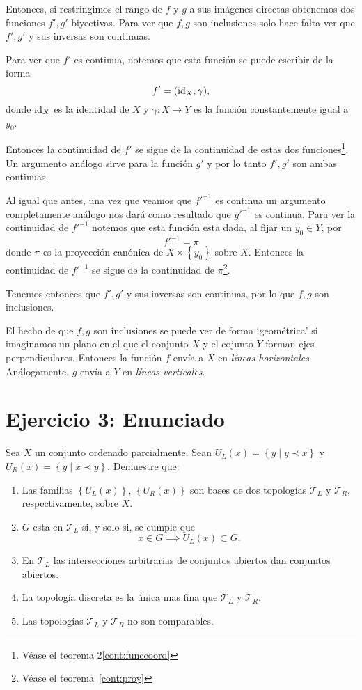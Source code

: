 \documentclass[fleqn,leqno,11pt,letterpaper,final]{article}
\begin{document}
Entonces, si restringimos el rango de $f$ y $g$ a sus
imágenes directas obtenemos dos funciones $f',g'$
biyectivas. Para ver que $f,g$ son inclusiones solo
hace falta ver que $f',g'$ y sus inversas son
continuas.

Para ver que $f'$ es continua, notemos que esta función
se puede escribir de la forma
\[
f'=(\operatorname{id}_X,\gamma),
\]
donde $\operatorname{id}_X$ es la identidad de $X$ y $\gamma:X\to Y$ 
es la función constantemente igual a $y_0$.

Entonces la continuidad de $f'$ se sigue de la
continuidad de estas dos funciones\footnote{Véase el teorema 2\ref{cont:funccoord}}. Un argumento
análogo sirve para la función $g'$ y por lo tanto
$f',g'$ son ambas continuas.

Al igual que antes, una vez que veamos que $f'^{-1}$ es
continua un argumento completamente análogo nos dará
como resultado que $g'^{-1}$ es continua. Para ver la
continuidad de $f'^{-1}$ notemos que esta función esta
dada, al fijar un $y_0\in Y$, por
\[
f'^{-1}=\pi	
\]
donde $\pi$ es la proyección canónica de $X\times\left\{ y_0 \right\}$
sobre $X$. Entonces la continuidad de $f'^{-1}$ se
sigue de la continuidad de $\pi$\footnote{Véase el teorema~\ref{cont:proy}}.

Tenemos entonces que $f',g'$ y sus inversas son
continuas, por lo que $f,g$ son inclusiones.

\begin{obs}
	El hecho de que $f,g$ son inclusiones se puede ver de forma `geométrica' si imaginamos un plano en el que el conjunto $X$ y el cojunto $Y$ forman ejes perpendiculares. Entonces la función $f$ envía a $X$ en \emph{líneas horizontales}. Análogamente, $g$ envía a $Y$ en \emph{líneas verticales}.
\end{obs}

\section{Ejercicio 3: Enunciado}
\hspace{-.6em}\footnotemark Sea $X$ un conjunto ordenado parcialmente. Sean $U_L(x)=\left\{ y\mid y\prec x \right\}$ y
$U_R(x)=\left\{ y\mid x\prec y \right\}$. Demuestre que:
\begin{enumerate}
	\item Las familias $\left\{ U_L(x) \right\}$, $\left\{ U_R(x) \right\}$ son bases de dos topologías
	$\mathcal{T}_L$ y $\mathcal{T}_R$, respectivamente, sobre $X$.
	\item $G$ esta en $\mathcal{T}_L$ si, y solo si, se cumple que 
	\[
	x\in G\implies U_L(x)\subset G.
	\]
	\item En $\mathcal{T}_L$ las intersecciones arbitrarias de conjuntos abiertos
	dan conjuntos abiertos.
	\item La topología discreta es la única mas fina que $\mathcal{T}_L$ y $\mathcal{T}_R$.
	\item Las topologías $\mathcal{T}_L$ y $\mathcal{T}_R$ no son comparables. 
\end{enumerate}
\end{document}
